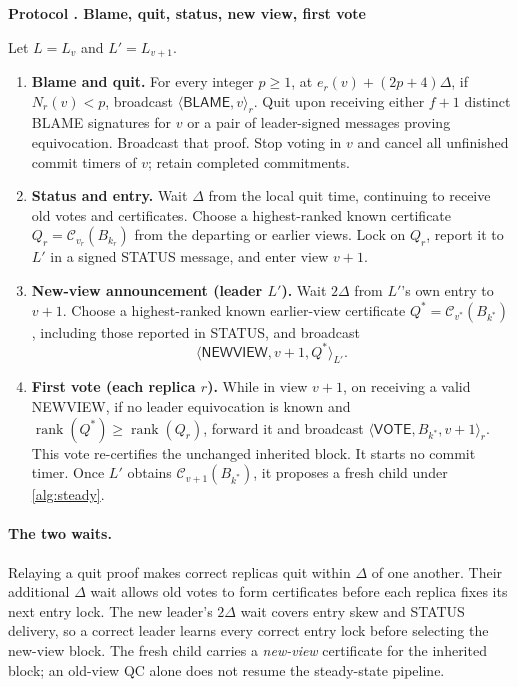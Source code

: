 \documentclass[11pt,a4paper]{article}
\newcommand{\QC}{\mathcal C}
\newcommand{\rank}{\operatorname{rank}}
\newcommand{\tagg}[1]{\ensuremath{\mathsf{#1}}}
\newcommand{\signed}[2]{\langle #1\rangle_{#2}}
\newcounter{protocol}
\newenvironment{protocol}[2]{\refstepcounter{protocol}\label{#1}
\begin{mdframed}[nobreak=true,linewidth=.6pt,skipabove=8pt,skipbelow=8pt,
innertopmargin=7pt,innerbottommargin=7pt]\small
\textbf{Protocol \theprotocol. #2}\par\smallskip}{\end{mdframed}}
\begin{document}
\begin{protocol}{alg:change}{Blame, quit, status, new view, first vote}
Let $L=L_v$ and $L'=L_{v+1}$.
\begin{enumerate}[label=\textbf{V\arabic*.},itemsep=4pt]
\item \textbf{Blame and quit.} For every integer $p\geq1$, at
$e_r(v)+(2p+4)\Delta$, if $N_r(v)<p$, broadcast
$\signed{\tagg{BLAME},v}{r}$.
Quit upon receiving either $f+1$ distinct BLAME signatures for $v$
or a pair of leader-signed messages proving equivocation. Broadcast
that proof. Stop voting in $v$ and cancel all unfinished commit
timers of $v$; retain completed commitments.

\item \textbf{Status and entry.} Wait $\Delta$ from the local quit
time, continuing to receive old votes and certificates. Choose a
highest-ranked known certificate $Q_r=\QC_{v_r}(B_{k_r})$ from the
departing or earlier views. Lock on $Q_r$, report it to $L'$ in a
signed STATUS message, and enter view $v+1$.

\item \textbf{New-view announcement (leader $L'$).} Wait $2\Delta$
from $L'$'s own entry to $v+1$. Choose a highest-ranked known
earlier-view certificate $Q^*=\QC_{v^*}(B_{k^*})$, including those
reported in STATUS, and broadcast
\[
 \signed{\tagg{NEWVIEW},v+1,Q^*}{L'}.
\]

\item \textbf{First vote (each replica $r$).} While in view $v+1$,
on receiving a valid NEWVIEW, if no leader equivocation is known and
$\rank(Q^*)\geq\rank(Q_r)$, forward it and broadcast
$\signed{\tagg{VOTE},B_{k^*},v+1}{r}$.
This vote re-certifies the unchanged inherited block. It starts no
commit timer. Once $L'$ obtains $\QC_{v+1}(B_{k^*})$, it proposes
a fresh child under \cref{alg:steady}.
\end{enumerate}
\end{protocol}

\paragraph{The two waits.}
Relaying a quit proof makes correct replicas quit within $\Delta$ of
one another. Their additional $\Delta$ wait allows old votes to form
certificates before each replica fixes its next entry lock. The new
leader's $2\Delta$ wait covers entry skew and STATUS delivery, so a
correct leader learns every correct entry lock before selecting the
new-view block. The fresh child carries a \emph{new-view} certificate
for the inherited block; an old-view QC alone does not resume the
steady-state pipeline.
\end{document}
